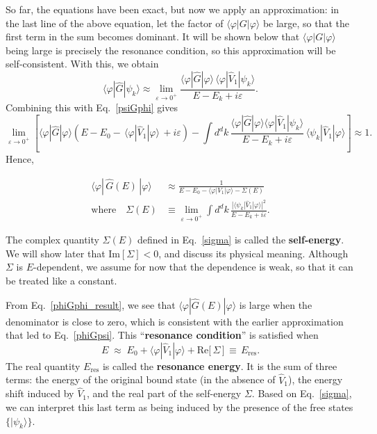 \documentclass[pra,12pt]{revtex4}
\begin{document}
So far, the equations have been exact, but now we apply an
approximation: in the last line of the above equation, let the factor
of $\langle\varphi|G|\varphi\rangle$ be large, so that the first term
in the sum becomes dominant.  It will be shown below that
$\langle\varphi|G|\varphi\rangle$ being large is precisely the
resonance condition, so this approximation will be self-consistent.
With this, we obtain
\begin{equation}
  \langle\varphi|\hat{G}|\psi_k\rangle \approx \lim_{\varepsilon\rightarrow0^+} \frac{\langle\varphi|\hat{G}|\varphi\rangle \, \langle\varphi|\hat{V}_1|\psi_k\rangle}{E-E_k+i\varepsilon}.
  \label{phiGpsi}
\end{equation}
Combining this with Eq.~\eqref{psiGphi} gives
\begin{equation*}
  \lim_{\varepsilon\rightarrow0^+} \left[\langle\varphi|\hat{G}|\varphi\rangle \left(E - E_0 -\, \langle\varphi|\hat{V}_1|\varphi\rangle \, + i\varepsilon\right) - \int d^dk\, \frac{\langle\varphi|\hat{G}|\varphi\rangle\langle\varphi|\hat{V}_1|\psi_k\rangle}{E-E_k+i\varepsilon} \, \langle\psi_k| \hat{V}_1|\varphi\rangle\right] \approx 1.
\end{equation*}
Hence,
\begin{framed}
  \begin{align}
    \langle\varphi|\,\hat{G}(E)\,|\varphi\rangle
    &\approx \frac{1}{\displaystyle E - E_0 - \langle\varphi|V_1|\varphi\rangle - \Sigma(E)}
    \label{phiGphi_result} \\
    \mathrm{where}\quad
    \Sigma(E) &\equiv \lim_{\varepsilon\rightarrow0^+}
    \int d^dk\, \frac{\displaystyle| \langle\psi_k| \hat{V}_1|\varphi\rangle|^2}{\displaystyle E-E_k+i\varepsilon}.
    \label{sigma}
  \end{align}
\end{framed}
\vskip -0.12in
The complex quantity $\Sigma(E)$ defined in Eq.~\eqref{sigma} is
called the \textbf{self-energy}.  We will show later that
$\mathrm{Im}[\Sigma] < 0$, and discuss its physical meaning.  Although
$\Sigma$ is $E$-dependent, we assume for now that the dependence is
weak, so that it can be treated like a constant.

From Eq.~\eqref{phiGphi_result}, we see that
$\langle\varphi|\hat{G}(E)|\varphi\rangle$ is large when the
denominator is close to zero, which is consistent with the earlier
approximation that led to Eq.~\eqref{phiGpsi}.  This
``\textbf{resonance condition}'' is satisfied when
\begin{equation}
  E \;\approx\; E_0 + \langle\varphi|\hat{V}_1|\varphi\rangle + \mathrm{Re}\big[\,\Sigma\,\big]  \,\equiv \, E_{\mathrm{res}}.
\end{equation}
The real quantity $E_{\mathrm{res}}$ is called the \textbf{resonance
  energy}.  It is the sum of three terms: the energy of the original
bound state (in the absence of $\hat{V}_1$), the energy shift induced
by $\hat{V}_1$, and the real part of the self-energy $\Sigma$.  Based
on Eq.~\eqref{sigma}, we can interpret this last term as being induced
by the presence of the free states $\{|\psi_k\rangle\}$.
\end{document}

